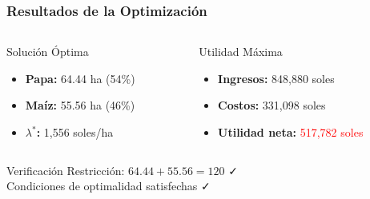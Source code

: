 \documentclass{beamer}
\begin{document}
\begin{frame}
\frametitle{Resultados de la Optimización}

\begin{columns}
\begin{column}{0.5\textwidth}
\begin{block}{Solución Óptima}
\begin{itemize}
\item \textbf{Papa:} 64.44 ha (54\%)
\item \textbf{Maíz:} 55.56 ha (46\%)
\item \textbf{$\lambda^*$:} 1,556 soles/ha
\end{itemize}
\end{block}
\end{column}
\begin{column}{0.5\textwidth}
\begin{block}{Utilidad Máxima}
\begin{itemize}
\item \textbf{Ingresos:} 848,880 soles
\item \textbf{Costos:} 331,098 soles
\item \textbf{Utilidad neta:} \textcolor{red}{517,782 soles}
\end{itemize}
\end{block}
\end{column}
\end{columns}

\vspace{0.5cm}

\begin{alertblock}{Verificación}
Restricción: $64.44 + 55.56 = 120$ ✓ \\
Condiciones de optimalidad satisfechas ✓
\end{alertblock}

\end{frame}
\end{document}
